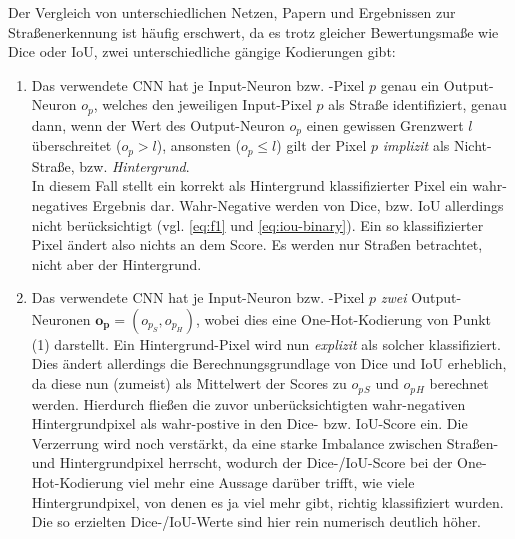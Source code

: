 Der Vergleich von unterschiedlichen Netzen, Papern und Ergebnissen zur Straßenerkennung ist häufig erschwert, 
da es trotz gleicher Bewertungsmaße wie Dice oder \ac{IoU}, zwei unterschiedliche gängige Kodierungen gibt:
\begin{enumerate}
	\item Das verwendete \ac{CNN} hat je Input-Neuron bzw. -Pixel $p$ genau ein Output-Neuron $o_p$, welches den jeweiligen Input-Pixel $p$
	als Straße identifiziert, genau dann, wenn der Wert des Output-Neuron $o_p$ einen gewissen Grenzwert $l$ überschreitet ($o_p > l$), 
	ansonsten ($o_p \leq l$) gilt der Pixel $p$ \textit{implizit} als Nicht-Straße, bzw. \textit{Hintergrund}. \\
	In diesem Fall stellt ein korrekt als Hintergrund klassifizierter Pixel ein wahr-negatives Ergebnis dar. 
	Wahr-Negative werden von Dice, bzw. \ac{IoU} allerdings nicht berücksichtigt (vgl. \autoref{eq:f1} und \ref{eq:iou-binary}).
	Ein so klassifizierter Pixel ändert also nichts an dem Score. Es werden nur Straßen betrachtet, nicht aber der Hintergrund.    
	\item Das verwendete \ac{CNN} hat je Input-Neuron bzw. -Pixel $p$ \textit{zwei} Output-Neuronen $\mathbf{o_p} = (o_{p_S}, o_{p_H})$, 
	wobei dies eine One-Hot-Kodierung von Punkt (1) darstellt. 
	Ein Hintergrund-Pixel wird nun \textit{explizit} als solcher klassifiziert. 
	Dies ändert allerdings die Berechnungsgrundlage von Dice und \ac{IoU} erheblich, da diese nun (zumeist) als Mittelwert 
	der Scores zu $o_p{_S}$ und $o_p{_H}$ berechnet werden. Hierdurch fließen die zuvor unberücksichtigten wahr-negativen 
	Hintergrundpixel als wahr-postive in den Dice- bzw. \ac{IoU}-Score ein. Die Verzerrung wird noch verstärkt, 
	da eine starke Imbalance zwischen Straßen- und Hintergrundpixel herrscht, wodurch der Dice-/\ac{IoU}-Score bei 
	der One-Hot-Kodierung viel mehr eine Aussage darüber trifft, wie viele Hintergrundpixel, von denen es ja viel mehr gibt,
	richtig klassifiziert wurden. Die so erzielten Dice-/IoU-Werte sind hier rein numerisch deutlich höher. 
\end{enumerate}

